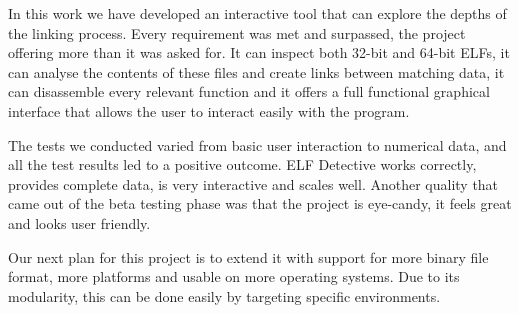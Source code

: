 In this work we have developed an interactive tool that can explore the depths of the linking process. Every requirement was met and surpassed, the project offering more than it was asked for. It can inspect both 32-{}bit and 64-{}bit ELFs, it can analyse the contents of these files and create links between matching data, it can disassemble every relevant function and it offers a full functional graphical interface that allows the user to interact easily with the program.

The tests we conducted varied from basic user interaction to numerical data, and all the test results led to a positive outcome. ELF Detective works correctly, provides complete data, is very interactive and scales well. Another quality that came out of the beta testing phase was that the project is eye-{}candy, it feels great and looks user friendly. 

Our next plan for this project is to extend it with support for more binary file format, more platforms and usable on more operating systems. Due to its modularity, this can be done easily by targeting specific environments.
